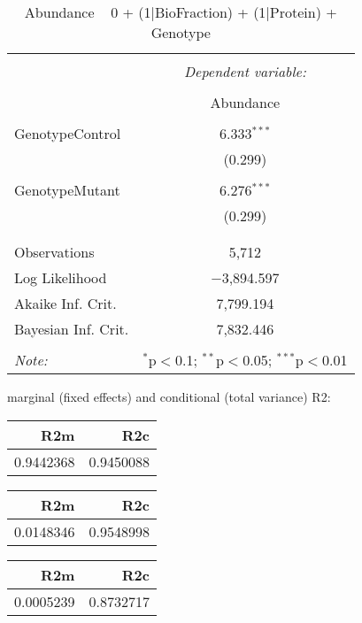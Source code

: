 \documentclass[11pt]{report}
\begin{document}
\begin{table}[!htbp] \centering 
  \caption{Abundance ~ 0 + (1|BioFraction) + (1|Protein) + Genotype} 
  \label{} 
\begin{tabular}{@{\extracolsep{5pt}}lc} 
\\[-1.8ex]\hline 
\hline \\[-1.8ex] 
 & \multicolumn{1}{c}{\textit{Dependent variable:}} \\ 
\cline{2-2} 
\\[-1.8ex] & Abundance \\ 
\hline \\[-1.8ex] 
 GenotypeControl & 6.333$^{***}$ \\ 
  & (0.299) \\ 
  & \\ 
 GenotypeMutant & 6.276$^{***}$ \\ 
  & (0.299) \\ 
  & \\ 
\hline \\[-1.8ex] 
Observations & 5,712 \\ 
Log Likelihood & $-$3,894.597 \\ 
Akaike Inf. Crit. & 7,799.194 \\ 
Bayesian Inf. Crit. & 7,832.446 \\ 
\hline 
\hline \\[-1.8ex] 
\textit{Note:}  & \multicolumn{1}{r}{$^{*}$p$<$0.1; $^{**}$p$<$0.05; $^{***}$p$<$0.01} \\ 
\end{tabular} 
\end{table} 
marginal (fixed effects) and conditional (total variance) R2:

\begin{tabular}{r|r}
\hline
R2m & R2c\\
\hline
0.9442368 & 0.9450088\\
\hline
\end{tabular}

\begin{tabular}{r|r}
\hline
R2m & R2c\\
\hline
0.0148346 & 0.9548998\\
\hline
\end{tabular}

\begin{tabular}{r|r}
\hline
R2m & R2c\\
\hline
0.0005239 & 0.8732717\\
\hline
\end{tabular}
\end{document}
